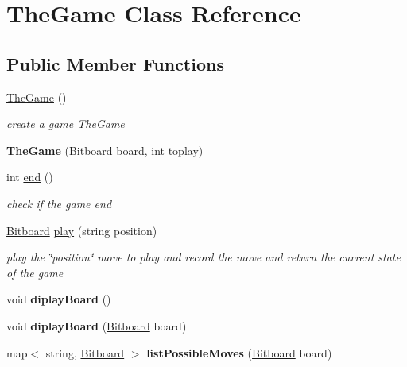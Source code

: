 \hypertarget{class_the_game}{\section{The\+Game Class Reference}
\label{class_the_game}
}
\subsection*{Public Member Functions}
\begin{DoxyCompactItemize}
\item 
\hyperlink{class_the_game_a22115648d9cfa662df971517ebb526b4}{The\+Game} ()
\begin{DoxyCompactList}\small\item\em create a game \hyperlink{class_the_game}{The\+Game} \end{DoxyCompactList}\item 
\hypertarget{class_the_game_a037876f628bd7a5e4943cd05fbab692e}{{\bfseries The\+Game} (\hyperlink{class_bitboard}{Bitboard} board, int toplay)}\label{class_the_game_a037876f628bd7a5e4943cd05fbab692e}

\item 
int \hyperlink{class_the_game_adc6e565425e62bb4d61d75dfbdeb5bca}{end} ()
\begin{DoxyCompactList}\small\item\em check if the game end \end{DoxyCompactList}\item 
\hyperlink{class_bitboard}{Bitboard} \hyperlink{class_the_game_aaa5087403ad9760fd68fcc024b40b593}{play} (string position)
\begin{DoxyCompactList}\small\item\em play the \char`\"{}position\char`\"{} move to play and record the move and return the current state of the game \end{DoxyCompactList}\item 
\hypertarget{class_the_game_ae0f819887bc6abe960a0c219e8fa02d5}{void {\bfseries diplay\+Board} ()}\label{class_the_game_ae0f819887bc6abe960a0c219e8fa02d5}

\item 
\hypertarget{class_the_game_a5d1c73e7daae9386b632aa5cdc203584}{void {\bfseries diplay\+Board} (\hyperlink{class_bitboard}{Bitboard} board)}\label{class_the_game_a5d1c73e7daae9386b632aa5cdc203584}

\item 
\hypertarget{class_the_game_af57f4711621420ae75d9320db563fb56}{map$<$ string, \hyperlink{class_bitboard}{Bitboard} $>$ {\bfseries list\+Possible\+Moves} (\hyperlink{class_bitboard}{Bitboard} board)}\label{class_the_game_af57f4711621420ae75d9320db563fb56}

\end{DoxyCompactItemize}



